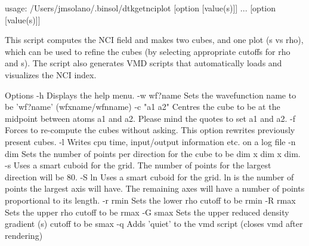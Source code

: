 
    usage: /Users/jmsolano/.binsol/dtkgetnciplot [option [value(s)]] ... [option [value(s)]]

This script computes the NCI field and makes two cubes, and one plot
(s vs rho), which can be used to refine the cubes (by selecting
appropriate cutoffs for rho and s). The script also generates
VMD scripts that automatically loads and visualizes the 
NCI index.

Options 
  -h           Displays the help menu.
  -w wf?name   Sets the wavefunction name to be 'wf?name' (wfxname/wfnname)
  -c "a1 a2"     Centres the cube to be at the midpoint between atoms a1 and
                 a2. Please mind the quotes to set a1 and a2.
  -f           Forces to re-compute the cubes without asking. This option
                 rewrites previously present cubes.
  -l        	Writes cpu time, input/output information etc. on a log file
  -n  dim   	Sets the number of points per direction for the cube
            	  to be dim x dim x dim.
  -s        	Uses a smart cuboid for the grid. The number of points for the
            	  largest direction will be 80.
  -S ln     	Uses a smart cuboid for the grid. ln is the number of points
            	  the largest axis will have. The remaining axes will have
            	  a number of points proportional to its length.
  -r rmin      Sets the lower rho cutoff to be rmin
  -R rmax      Sets the upper rho cutoff to be rmax
  -G smax      Sets the upper reduced density gradient (s) cutoff to be smax
  -q           Adds 'quiet' to the vmd script (closes vmd after rendering)


